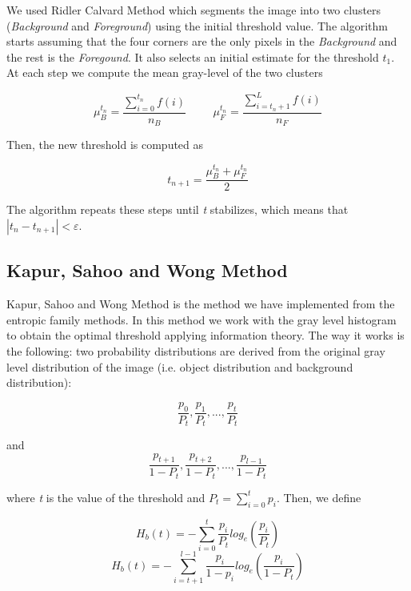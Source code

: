 \documentclass[12]{article}
\begin{document}
We used Ridler Calvard Method which segments the image into two clusters (\textit{Background} and \textit{Foreground}) using the initial threshold value. The algorithm starts assuming that the four corners are the only pixels in the \textit{Background} and the rest is the \textit{Foregound}. It also selects an initial estimate for the threshold \textit{$t_1$}. At each step we compute the mean gray-level of the two clusters
\vspace{-0.5cm}
\begin{center}
$$ \mu_{B}^{t_n} = \frac{\sum_{i = 0}^{t_n} f(i)}{n_B} \hspace{1cm} \mu_{F}^{t_n} = \frac{\sum_{i = t_n + 1}^{L} f(i)}{n_F} $$
\end{center}
Then, the new threshold is computed as
\vspace{-0.5cm}
\begin{center}
$$ t_{n + 1} = \frac{\mu_{B}^{t_n} + \mu_{F}^{t_n}}{2} $$
\end{center}
The algorithm repeats these steps until \textit{t} stabilizes, which means that $|t_n - t_{n + 1}| < \varepsilon $.

\subsection{Kapur, Sahoo and Wong Method}
Kapur, Sahoo and Wong Method is the method we have implemented from the entropic family methods. In this method we work with the gray level histogram to obtain the optimal threshold applying information theory.
The way it works is the following: two probability distributions are derived from the original gray level distribution of the image (i.e. object distribution and background distribution): 
\vspace{-0.5cm}
\begin{center}
$$\frac{p_0}{P_t},\frac{p_1}{P_t},...,\frac{p_t}{P_t}$$
\end{center} \begin{center}
and
$$\frac{p_{t+1}}{1-P_t},\frac{p_{t+2}}{1-P_t},...,\frac{p_{l-1}}{1-P_t}$$
\end{center}
\vspace{0.4cm}

where \textit{t} is the value of the threshold and $P_t = \sum_{i=0}^{t}{p_i}$. Then, we define

$$H_b(t) = - \sum_{i = 0}^{t} \frac{p_i}{P_t}log_e\left(\frac{p_i}{P_t}\right)$$
$$ H_b(t) = - \sum_{i = t+1}^{l-1} \frac{p_i}{1-p_i}log_e\left(\frac{p_i}{1-P_t}\right)$$
\end{document}

